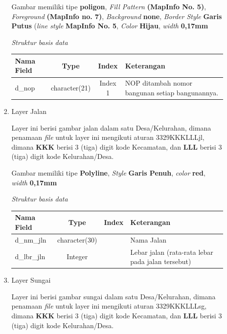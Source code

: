 \begin{enumerate}[\bfseries A.]
\begin{enumerate}[1.]
\begin{enumerate}[1.]
        Gambar memiliki tipe \textbf{poligon}, \textit{Fill Pattern} \textbf{(MapInfo No. 5)}, \textit{Foreground} \textbf{(MapInfo no. 7)}, \textit{Background} \textbf{none}, \textit{Border Style} \textbf{Garis Putus} (\textit{line style} \textbf{MapInfo No. 5}, \textit{Color} \textbf{Hijau}, \textit{width} \textbf{0,17mm}
        
        \textit{Struktur basis data}
      
        \begin{tabular}{| l | c | c | p{5cm} |}
          \hline
          Nama Field & Type & Index & Keterangan \\
          \hline
          d\_nop & character(21) & Index 1 & NOP ditambah nomor bangunan setiap bangunannya.\\
          \hline
        \end{tabular}
      
      \item Layer Jalan
      
        Layer ini berisi gambar jalan dalam satu Desa/Kelurahan, dimana penamaan \textit{file} untuk layer ini mengikuti aturan 3329KKKLLLjl, dimana \textbf{KKK} berisi 3 (tiga) digit kode Kecamatan, dan \textbf{LLL} berisi 3 (tiga) digit kode Kelurahan/Desa.
      
        Gambar memiliki tipe \textbf{Polyline}, \textit{Style} \textbf{Garis Penuh}, \textit{color} \textbf{red}, \textit{width} \textbf{0,17mm}
        
        \textit{Struktur basis data}
      
        \begin{tabular}{| l | c | c | p{5cm} |}
          \hline
          Nama Field & Type & Index & Keterangan \\
          \hline
          d\_nm\_jln & character(30) & & Nama Jalan \\
          \hline
          d\_lbr\_jln & Integer & & Lebar jalan (rata-rata lebar pada jalan tersebut) \\    
          \hline
        \end{tabular}

      
      \item Layer Sungai
      
        Layer ini berisi gambar sungai dalam satu Desa/Kelurahan, dimana penamaan \textit{file} untuk layer ini mengikuti aturan 3329KKKLLLsg, dimana \textbf{KKK} berisi 3 (tiga) digit kode Kecamatan, dan \textbf{LLL} berisi 3 (tiga) digit kode Kelurahan/Desa.
      

\end{enumerate}
\end{enumerate}
\end{enumerate}
